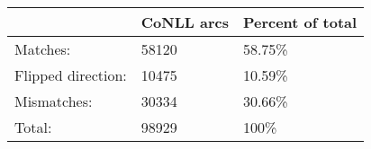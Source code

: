 	\begin{tabular}{|l|l|l|}
		\hline
		 & CoNLL arcs & Percent of total \\ 
		\hline
		Matches: & 58120 & 58.75\%\\ 
		\hline
		Flipped direction: & 10475 & 10.59\%\\ 
		\hline
		Mismatches: & 30334 & 30.66\%\\ 
		\hline
		Total: & 98929 & 100\% \\ 
		\hline
	\end{tabular}
